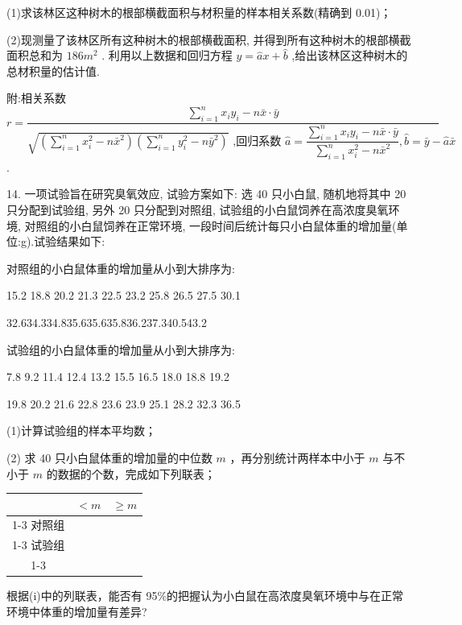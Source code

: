 (1)求该林区这种树木的根部横截面积与材积量的样本相关系数(精确到 0.01)；

(2)现测量了该林区所有这种树木的根部横截面积, 并得到所有这种树木的根部横截面积总和为 ${186}{{m}}^{2}$ . 利用以上数据和回归方程 $y = \widehat{a}x + \widehat{b}$ ,给出该林区这种树木的总材积量的估计值.

附:相关系数 $r = \dfrac{\mathop{\sum }\limits_{{i = 1}}^{n}{x}_{i}{y}_{i} - n\bar{x} \cdot  \bar{y}}{\sqrt{\left( {\mathop{\sum }\limits_{{i = 1}}^{n}{x}_{i}^{2} - n{\bar{x}}^{2}}\right) \left( {\mathop{\sum }\limits_{{i = 1}}^{n}{y}_{i}^{2} - n{\bar{y}}^{2}}\right) }\text{ ,回归系数 }\widehat{a} = \dfrac{\mathop{\sum }\limits_{{i = 1}}^{n}{x}_{i}{y}_{i} - n\bar{x} \cdot  \bar{y}}{\mathop{\sum }\limits_{{i = 1}}^{n}{x}_{i}^{2} - n{\bar{x}}^{2}},\widehat{b} = \bar{y} - \widehat{a}\bar{x}}$ .

14. 一项试验旨在研究臭氧效应, 试验方案如下: 选 40 只小白鼠, 随机地将其中 20 只分配到试验组, 另外 20 只分配到对照组, 试验组的小白鼠饲养在高浓度臭氧环境, 对照组的小白鼠饲养在正常环境, 一段时间后统计每只小白鼠体重的增加量(单位:g).试验结果如下:

对照组的小白鼠体重的增加量从小到大排序为:

15.2 18.8 20.2 21.3 22.5 23.2 25.8 26.5 27.5 30.1

32.634.334.835.635.635.836.237.340.543.2

试验组的小白鼠体重的增加量从小到大排序为:

7.8 9.2 11.4 12.4 13.2 15.5 16.5 18.0 18.8 19.2

19.8 20.2 21.6 22.8 23.6 23.9 25.1 28.2 32.3 36.5

(1)计算试验组的样本平均数；

(2)   求 40 只小白鼠体重的增加量的中位数 $m$ ，再分别统计两样本中小于 $m$ 与不小于 $m$ 的数据的个数，完成如下列联表；

\begin{center}
\begin{tabular}{|c|c|c|}
\hline
\phantom{X} & $< m$ & $\geq  m$ \\
\cline{1-3}
对照组 & \phantom{X} & \phantom{X} \\
\cline{1-3}
试验组 & \phantom{X} & \phantom{X} \\
\cline{1-3}
\hline
\end{tabular}
\end{center}

  根据(i)中的列联表，能否有 95\%的把握认为小白鼠在高浓度臭氧环境中与在正常环境中体重的增加量有差异?

